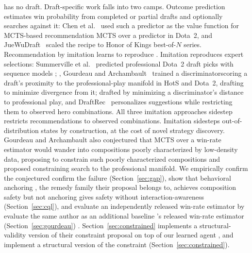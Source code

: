 \documentclass[journal]{IEEEtran}
\providecommand{\DIFaddtex}[1]{{\protect\color{blue} \sf #1}} %
\providecommand{\DIFdeltex}[1]{{\protect\color{red} \scriptsize #1}} %
\providecommand{\DIFaddbegin}{} %
\providecommand{\DIFaddend}{} %
\providecommand{\DIFdelbegin}{} %
\providecommand{\DIFdelend}{} %
\providecommand{\DIFadd}[1]{\texorpdfstring{\DIFaddtex{#1}}{#1}} %
\providecommand{\DIFdel}[1]{\texorpdfstring{\DIFdeltex{#1}}{}} %
\begin{document}
\DIFdelend \DIFaddbegin \DIFadd{has no draft. }\DIFaddend Draft-specific work falls into two camps. Outcome prediction estimates win probability \DIFdelbegin \DIFdel{from completed or partial drafts }\DIFdelend and optionally searches against it: Chen et al.~\cite{chen2018drafting} used \DIFdelbegin \DIFdel{such a predictor as the value function for MCTS-based recommendation }\DIFdelend \DIFaddbegin \DIFadd{MCTS over a predictor }\DIFaddend in Dota~2, and JueWuDraft~\cite{chen2021juewudraft} scaled the recipe to Honor of Kings\DIFdelbegin \DIFdel{best-of-$N$ series. Recommendation by imitation learns to reproduce }\DIFdelend \DIFaddbegin \DIFadd{. Imitation reproduces }\DIFaddend expert selections: Summerville et al.~\cite{summerville2016draft} predicted professional \DIFdelbegin \DIFdel{Dota~2 draft }\DIFdelend picks with sequence models\DIFdelbegin \DIFdel{; }\DIFdelend \DIFaddbegin \DIFadd{, }\DIFaddend Gourdeau and Archambault~\cite{gourdeau2021discriminative} \DIFdelbegin \DIFdel{trained a discriminatorscoring a draft's proximity to the professional-play manifold in HotS and Dota~2, drafting to minimize divergence from it; }\DIFdelend \DIFaddbegin \DIFadd{drafted by minimizing a discriminator's distance to professional play, }\DIFaddend and DraftRec~\cite{lee2022draftrec} \DIFdelbegin \DIFdel{personalizes suggestions while restricting them to observed hero combinations. All three imitation approaches sidestep }\DIFdelend \DIFaddbegin \DIFadd{restricts recommendations to observed combinations. Imitation sidesteps }\DIFaddend out-of-distribution states \DIFdelbegin \DIFdel{by construction, }\DIFdelend at the cost of novel strategy\DIFdelbegin \DIFdel{discovery}\DIFdelend . Gourdeau and Archambault \DIFdelbegin \DIFdel{also }\DIFdelend conjectured that MCTS over a win-rate estimator would wander into \DIFdelbegin \DIFdel{compositions poorly characterized by low-density data, proposing to constrain such }\DIFdelend \DIFaddbegin \DIFadd{poorly characterized compositions and proposed constraining }\DIFaddend search to the professional manifold. We \DIFdelbegin \DIFdel{empirically confirm the conjectured }\DIFdelend \DIFaddbegin \DIFadd{confirm the }\DIFaddend failure (Section~\ref{sec:gap}), show that \DIFdelbegin \DIFdel{behavioral anchoring , the remedy family their proposal belongs to, achieves composition safety but not }\DIFdelend \DIFaddbegin \DIFadd{anchoring gives safety without }\DIFaddend interaction-awareness (Section~\ref{sec:cql}), \DIFdelbegin \DIFdel{and evaluate an independently released win-rate estimator by }\DIFdelend \DIFaddbegin \DIFadd{evaluate }\DIFaddend the same author\DIFdelbegin \DIFdel{as an additional baseline }\DIFdelend \DIFaddbegin \DIFadd{'s released win-rate estimator }\DIFaddend (Section~\ref{sec:gourdeau})\DIFdelbegin \DIFdel{. Section~\ref{sec:constrained} implements a structural-validity version of their constraint proposal on top of our learned agent}\DIFdelend \DIFaddbegin \DIFadd{, and implement a structural version of the constraint (Section~\ref{sec:constrained})}\DIFaddend .
\end{document}
